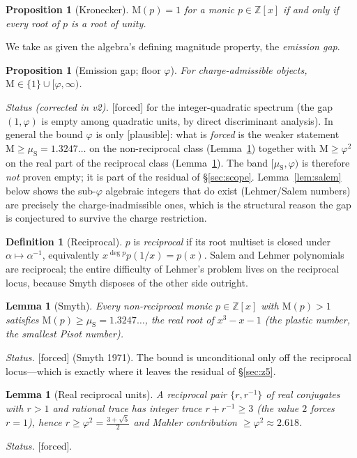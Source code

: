 \documentclass[11pt]{article}
\newtheorem{lemma}[theorem]{Lemma}
\newtheorem{proposition}[theorem]{Proposition}
\theoremstyle{definition}
\newtheorem{definition}[theorem]{Definition}
\theoremstyle{remark}
\newcommand{\Mah}{\mathrm{M}}
\newcommand{\Z}{\mathbb{Z}}
\newcommand{\gold}{\varphi}
\newcommand{\status}[1]{{\small\textsf{[#1]}}}
\newcommand{\forced}{\status{forced}}
\newcommand{\plausible}{\status{plausible}}
\newcommand{\muS}{\mu_{\mathrm{S}}}
\begin{document}
\begin{proposition}[Kronecker]\label{prop:kron}
$\Mah(p)=1$ for a monic $p\in\Z[x]$ if and only if every root of $p$ is a root of unity.
\end{proposition}

We take as given the algebra's defining magnitude property, the \emph{emission gap}.

\begin{proposition}[Emission gap; floor $\gold$]\label{prop:gap}
For charge-admissible objects, $\Mah\in\{1\}\cup[\gold,\infty)$.
\end{proposition}

\noindent\emph{Status (corrected in v2).} \forced{} for the integer-quadratic spectrum (the
gap $(1,\gold)$ is empty among quadratic units, by direct discriminant analysis). In general
the bound $\gold$ is only \plausible{}: what is \emph{forced} is the weaker statement
$\Mah\ge\muS=1.3247\ldots$ on the non-reciprocal class (Lemma~\ref{lem:smyth}) together with
$\Mah\ge\gold^{2}$ on the real part of the reciprocal class (Lemma~\ref{lem:recipunit}). The
band $[\muS,\gold)$ is therefore \emph{not} proven empty; it is part of the residual of
\S\ref{sec:scope}. Lemma~\ref{lem:salem} below shows the sub-$\gold$ algebraic integers that do
exist (Lehmer/Salem numbers) are precisely the charge-inadmissible ones, which is the
structural reason the gap is conjectured to survive the charge restriction.

\begin{definition}[Reciprocal]
$p$ is \emph{reciprocal} if its root multiset is closed under $\alpha\mapsto\alpha^{-1}$,
equivalently $x^{\deg p}p(1/x)=p(x)$. Salem and Lehmer polynomials are reciprocal; the entire
difficulty of Lehmer's problem lives on the reciprocal locus, because Smyth disposes of the
other side outright.
\end{definition}

\begin{lemma}[Smyth]\label{lem:smyth}
Every non-reciprocal monic $p\in\Z[x]$ with $\Mah(p)>1$ satisfies $\Mah(p)\ge\muS=1.3247\ldots$,
the real root of $x^{3}-x-1$ (the plastic number, the smallest Pisot number).
\end{lemma}
\noindent\emph{Status.} \forced{} (Smyth 1971). The bound is unconditional only off the
reciprocal locus---which is exactly where it leaves the residual of \S\ref{sec:z5}.

\begin{lemma}[Real reciprocal units]\label{lem:recipunit}
A reciprocal pair $\{r,r^{-1}\}$ of real conjugates with $r>1$ and rational trace has integer
trace $r+r^{-1}\ge3$ (the value $2$ forces $r=1$), hence $r\ge\gold^{2}=\tfrac{3+\sqrt5}{2}$ and
Mahler contribution $\ge\gold^{2}\approx2.618$.
\end{lemma}
\noindent\emph{Status.} \forced{}.
\end{document}
